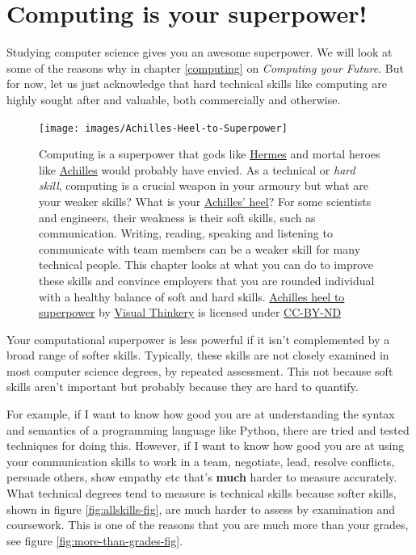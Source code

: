 \documentclass[
]{book}
\begin{document}
\hypertarget{superpower}{%
\section{Computing is your superpower!}\label{superpower}}

Studying computer science gives you an awesome superpower. We will look at some of the reasons why in chapter \ref{computing} on \emph{Computing your Future}. But for now, let us just acknowledge that hard technical skills like computing are highly sought after and valuable, both commercially and otherwise.

\begin{figure}

{\centering \texttt{[image: images/Achilles-Heel-to-Superpower]} 

}

\caption{Computing is a superpower that gods like \href{https://en.wikipedia.org/wiki/Hermes}{Hermes} and mortal heroes like \href{https://en.wikipedia.org/wiki/Achilles}{Achilles} would probably have envied. \citep{heroes} As a technical or \emph{hard skill}, computing is a crucial weapon in your armoury but what are your weaker skills? What is your \href{https://en.wikipedia.org/wiki/Achilles\%27_heel}{Achilles' heel}? For some scientists and engineers, their weakness is their soft skills, such as communication. Writing, reading, speaking and listening to communicate with team members can be a weaker skill for many technical people. This chapter looks at what you can do to improve these skills and convince employers that you are rounded individual with a healthy balance of soft and hard skills. \href{https://bryanmmathers.com/achilles-heel-to-superpower/}{Achilles heel to superpower} by \href{https://visualthinkery.com}{Visual Thinkery} is licensed under \href{https://creativecommons.org/licenses/by-nd/4.0/}{CC-BY-ND}}\label{fig:achilles-fig}
\end{figure}



Your computational superpower is less powerful if it isn't complemented by a broad range of softer skills. Typically, these skills are not closely examined in most computer science degrees, by repeated assessment. This not because soft skills aren't important but probably because they are hard to quantify.

For example, if I want to know how good you are at understanding the syntax and semantics of a programming language like Python, there are tried and tested techniques for doing this. However, if I want to know how good you are at using your communication skills to work in a team, negotiate, lead, resolve conflicts, persuade others, show empathy etc that's \textbf{much} harder to measure accurately. What technical degrees tend to measure is technical skills because softer skills, shown in figure \ref{fig:allskills-fig}, are much harder to assess by examination and coursework. This is one of the reasons that you are much more than your grades, see figure \ref{fig:more-than-grades-fig}.
\end{document}
